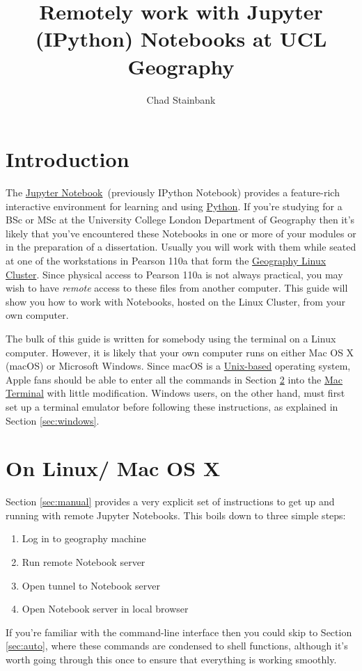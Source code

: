 \documentclass[a4paper]{article}
\title{Remotely work with Jupyter (IPython) Notebooks at UCL Geography}
\author{Chad Stainbank}
\begin{document}
\maketitle
\section{Introduction}
\label{sec:intro}
The \href{http://jupyter.org/}{Jupyter Notebook}~(previously IPython Notebook) provides a feature-rich interactive environment for learning and using \href{https://www.python.org/}{Python}.
If you're studying for a BSc or MSc at the University College London Department of Geography then it's likely that you've encountered these Notebooks in one or more of your modules or in the preparation of a dissertation.
Usually you will work with them while seated at one of the workstations in Pearson 110a that form the \href{http://www.geog.ucl.ac.uk/resources/computer-support/teaching-cluster}{Geography Linux Cluster}.
Since physical access to Pearson 110a is not always practical, you may wish to have \emph{remote} access to these files from another computer.
This guide will show you how to work with Notebooks, hosted on the Linux Cluster, from your own computer. 

The bulk of this guide is written for somebody using the terminal on a Linux computer.
However, it is likely that your own computer runs on either Mac OS X (macOS) or Microsoft Windows.
Since macOS is a \href{http://unix.stackexchange.com/questions/1489/is-mac-os-x-unix}{Unix-based} operating system, Apple fans should be able to enter all the commands in Section \ref{sec:linuxmac} into the \href{http://www.macworld.co.uk/feature/mac-software/get-more-out-of-os-x-terminal-3608274/}{Mac Terminal} with little modification.
Windows users, on the other hand, must first set up a terminal emulator before following these instructions, as explained in Section \ref{sec:windows}.



\section{On Linux/ Mac OS X}
\label{sec:linuxmac}
Section \ref{sec:manual} provides a very explicit set of instructions to get up and running with remote Jupyter Notebooks.
This boils down to three simple steps:
\begin{enumerate}
\item Log in to geography machine
\item Run remote Notebook server
\item Open tunnel to Notebook server
\item Open Notebook server in local browser
\end{enumerate}
If you're familiar with the command-line interface then you could skip to Section \ref{sec:auto}, where these commands are condensed to shell functions, although it's worth going through this once to ensure that everything is working smoothly.
\end{document}
